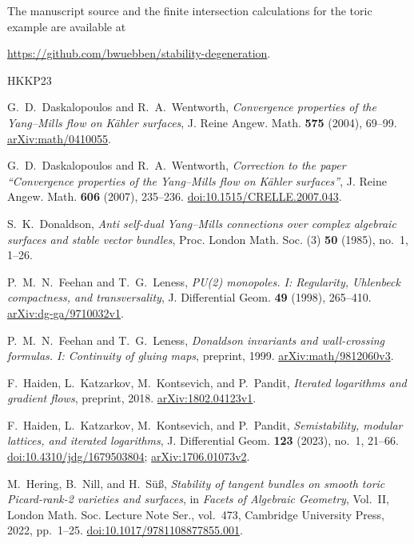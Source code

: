 \documentclass[11pt]{amsart}
\theoremstyle{definition}
\theoremstyle{remark}
\begin{document}
The manuscript source and the finite intersection calculations for the
toric example are available at
\begin{center}
\url{https://github.com/bwuebben/stability-degeneration}.
\end{center}

\begin{thebibliography}{HKKP23}

G.~D.~Daskalopoulos and R.~A.~Wentworth,
\emph{Convergence properties of the Yang--Mills flow on K\"ahler surfaces},
J. Reine Angew. Math. \textbf{575} (2004), 69--99.
\href{https://arxiv.org/abs/math/0410055}{arXiv:math/0410055}.

G.~D.~Daskalopoulos and R.~A.~Wentworth,
\emph{Correction to the paper ``Convergence properties of the Yang--Mills
flow on K\"ahler surfaces''},
J. Reine Angew. Math. \textbf{606} (2007), 235--236.
\href{https://doi.org/10.1515/CRELLE.2007.043}{doi:10.1515/CRELLE.2007.043}.

S.~K.~Donaldson, \emph{Anti self-dual Yang--Mills connections over complex
algebraic surfaces and stable vector bundles},
Proc. London Math. Soc. (3) \textbf{50} (1985), no.~1, 1--26.

P.~M.~N.~Feehan and T.~G.~Leness,
\emph{PU(2) monopoles. I: Regularity, Uhlenbeck compactness, and transversality},
J. Differential Geom. \textbf{49} (1998), 265--410.
\href{https://arxiv.org/abs/dg-ga/9710032v1}{arXiv:dg-ga/9710032v1}.

P.~M.~N.~Feehan and T.~G.~Leness,
\emph{Donaldson invariants and wall-crossing formulas. I: Continuity of gluing maps},
preprint, 1999.
\href{https://arxiv.org/abs/math/9812060v3}{arXiv:math/9812060v3}.

F.~Haiden, L.~Katzarkov, M.~Kontsevich, and P.~Pandit,
\emph{Iterated logarithms and gradient flows}, preprint, 2018.
\href{https://arxiv.org/abs/1802.04123v1}{arXiv:1802.04123v1}.

F.~Haiden, L.~Katzarkov, M.~Kontsevich, and P.~Pandit,
\emph{Semistability, modular lattices, and iterated logarithms},
J. Differential Geom. \textbf{123} (2023), no.~1, 21--66.
\href{https://doi.org/10.4310/jdg/1679503804}{doi:10.4310/jdg/1679503804};
\href{https://arxiv.org/abs/1706.01073v2}{arXiv:1706.01073v2}.

M.~Hering, B.~Nill, and H.~S\"u\ss,
\emph{Stability of tangent bundles on smooth toric Picard-rank-2 varieties
and surfaces}, in \emph{Facets of Algebraic Geometry}, Vol.~II,
London Math. Soc. Lecture Note Ser., vol.~473, Cambridge University Press,
2022, pp.~1--25.
\href{https://doi.org/10.1017/9781108877855.001}{doi:10.1017/9781108877855.001}.


\end{thebibliography}
\end{document}
